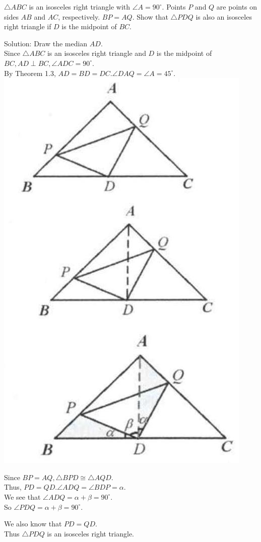 \documentclass{article}
\begin{document}
\(\triangle A B C\) is an isosceles right triangle with \(\angle A=90^{\circ}\). Points \(P\) and \(Q\) are points on sides \(A B\) and \(A C\), respectively. \(B P=A Q\). Show that \(\triangle P D Q\) is also an isosceles right triangle if \(D\) is the midpoint of \(B C\).

Solution:
Draw the median \(A D\).\\
Since \(\triangle A B C\) is an isosceles right triangle and \(D\) is the midpoint of \(B C, A D \perp B C, \angle A D C=90^{\circ}\).\\
By Theorem 1.3, \(A D=B D=D C . \angle D A Q=\angle A=45^{\circ}\).\\
\centering
\includegraphics[width=\textwidth]{images/013(1).jpg}

Since \(B P=A Q, \triangle B P D \cong \triangle A Q D\).\\
Thus, \(P D=Q D . \angle A D Q=\angle B D P=\alpha\).\\
We see that \(\angle A D Q=\alpha+\beta=90^{\circ}\).\\
So \(\angle P D Q=\alpha+\beta=90^{\circ}\).

We also know that \(P D=Q D\).\\
Thus \(\triangle P D Q\) is an isosceles right triangle.
\end{document}

